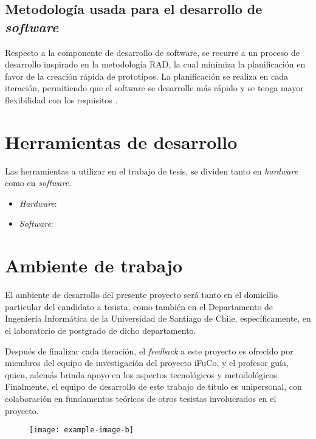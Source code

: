\subsection{Metodología usada para el desarrollo de \textit{software}}
\label{sub:metodologia-investigacion}
Respecto a la componente de desarrollo de software, se recurre a un proceso de desarrollo inspirado en la metodología RAD, la cual minimiza la planificación en favor de la creación rápida de prototipos. La planificación se realiza en cada iteración, permitiendo que el software se desarrolle más rápido y se tenga mayor flexibilidad con los requisitos \cite{mcconnell1996rapid}.

\section{Herramientas de desarrollo}
\label{sec:herramientas}
Las herramientas a utilizar en el trabajo de tesis, se dividen tanto en \textit{hardware} como en \textit{software}.

\begin{itemize}
\item \textit{Hardware}: 
\item \textit{Software}:
\end{itemize}

\section{Ambiente de trabajo}
El ambiente de desarrollo del presente proyecto será tanto en el domicilio particular del candidato a tesista, como también en el Departamento de Ingeniería Informática de la Universidad de Santiago de Chile, específicamente, en el laboratorio de postgrado de dicho departamento.

Después de finalizar cada iteración, el \textit{feedback} a este proyecto es ofrecido por miembros del equipo de investigación del proyecto iFuCo, y el profesor guía, quien, además brinda apoyo en los aspectos tecnológicos y metodológicos. Finalmente, el equipo de desarrollo de este trabajo de título es unipersonal, con colaboración en fundamentos teóricos de otros tesistas involucrados en el proyecto. 

\begin{figure}[htb]
	\centering
	\texttt{[image: example-image-b]} 
	\label{fig:CowLickingNose}
\end{figure}